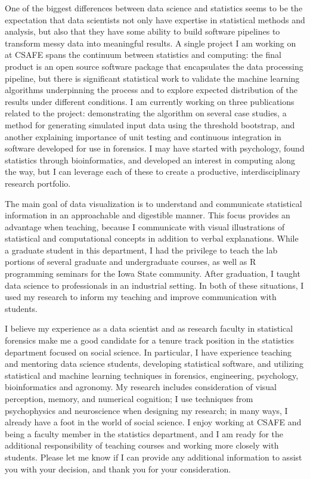 \documentclass[12pt, letterpaper, sans]{moderncv}
\begin{document}
One of the biggest differences between data science and statistics seems to be the expectation that data scientists not only have expertise in statistical methods and analysis, but also that they have some ability to build software pipelines to transform messy data into meaningful results. A single project I am working on at CSAFE spans the continuum between statistics and computing: the final product is an open source software package that encapsulates the data processing pipeline, but there is significant statistical work to validate the machine learning algorithms underpinning the process and to explore expected distribution of the results under different conditions. I am currently working on three publications related to the project: demonstrating the algorithm on several case studies, a method for generating simulated input data using the threshold bootstrap, and another explaining importance of unit testing and continuous integration in software developed for use in forensics. I may have started with psychology, found statistics through bioinformatics, and developed an interest in computing along the way, but I can leverage each of these to create a productive, interdisciplinary research portfolio.

The main goal of data visualization is to understand and communicate statistical information in an approachable and digestible manner. This focus provides an advantage when teaching, because I communicate with visual illustrations of statistical and computational concepts in addition to verbal explanations. While a graduate student in this department, I had the privilege to teach the lab portions of several graduate and undergraduate courses, as well as R programming seminars for the Iowa State community. After graduation, I taught data science to professionals in an industrial setting. In both of these situations, I used my research to inform my teaching and improve communication with students. 

I believe my experience as a data scientist and as research faculty in statistical forensics make me a good candidate for a tenure track position in the statistics department focused on social science. In particular, I have experience teaching and mentoring data science students, developing statistical software, and utilizing statistical and machine learning techniques in forensics, engineering, psychology, bioinformatics and agronomy. My research includes consideration of visual perception, memory, and numerical cognition; I use techniques from psychophysics and neuroscience when designing my research; in many ways, I already have a foot in the world of social science. I enjoy working at CSAFE and being a faculty member in the statistics department, and I am ready for the additional responsibility of teaching courses and working more closely with students. Please let me know if I can provide any additional information to assist you with your decision, and thank you for your consideration.  
\end{document}
